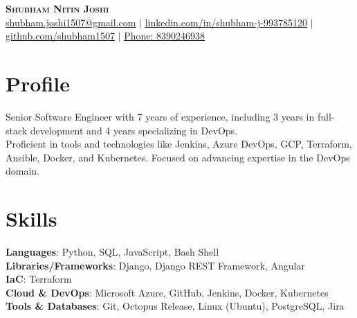 \documentclass[letterpaper, 11pt]{article}
\begin{document}
\begin{center}
    \textbf{\Huge \scshape Shubham Nitin Joshi} \\
    \href{mailto:shubham.joshi1507@gmail.com}{\underline{shubham.joshi1507@gmail.com}} $|$ 
    \href{https://www.linkedin.com/in/shubham-j-993785120/}{\underline{linkedin.com/in/shubham-j-993785120}} $|$
    \href{https://github.com/shubham1507}{\underline{github.com/shubham1507}} $|$
    \href{tel:8390246938}{\underline{Phone: 8390246938}}
\end{center}

\vspace{-15pt}

\section{Profile}
\small{
    Senior Software Engineer with 7 years of experience, including 3 years in full-stack development and 4 years specializing in DevOps. \\
    Proficient in tools and technologies like Jenkins, Azure DevOps, GCP, Terraform, Ansible, Docker, and Kubernetes. Focused on advancing expertise in the DevOps domain. \\
}

\vspace{-15pt}

\section{Skills}
\begin{itemize}[leftmargin=0.25in, label={}]
    \small{\item{
     \textbf{Languages}{: Python, SQL, JavaScript, Bash Shell} \\
     \textbf{Libraries/Frameworks}{: Django, Django REST Framework, Angular} \\
     \textbf{IaC}{: Terraform} \\
     \textbf{Cloud \& DevOps}{: Microsoft Azure, GitHub, Jenkins, Docker, Kubernetes} \\
     \textbf{Tools \& Databases}{: Git, Octopus Release, Linux (Ubuntu), PostgreSQL, Jira}
    }}
\end{itemize}

\vspace{-25pt}

\end{document}

